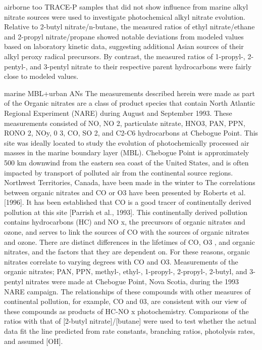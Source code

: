 \documentclass[11pt,a4paper]{article}
\begin{document}
\citep{Simpson2003} airborne too
TRACE-P samples that did not show influence from marine alkyl nitrate sources were used to investigate photochemical alkyl nitrate evolution. Relative to 2-butyl nitrate/n-butane, the measured ratios of ethyl nitrate/ethane and 2-propyl nitrate/propane showed notable deviations from modeled values based on laboratory kinetic data, suggesting additional Asian sources of their alkyl peroxy radical precursors. By contrast, the measured ratios of 1-propyl-, 2-pentyl-, and 3-pentyl nitrate to their respective parent hydrocarbons were fairly close to modeled values.

\citep{Roberts1998} marine MBL+urban ANs
The measurements described herein were made as part of the
Organic nitrates are a class of product species that contain
North Atlantic Regional Experiment (NARE) during August and September 1993. These measurements consisted of NO, NO 2, particulate nitrate, HNO3, PAN, PPN, RONO 2, NOy, 0 3, CO, SO 2, and C2-C6 hydrocarbons at Chebogue Point. This site was ideally located to study the evolution of photochemically processed air masses in the marine boundary layer (MBL). Chebogue Point is approximately 500 km downwind from the eastern sea coast of the United States, and is often impacted by transport of polluted air from the continental source regions.
Northwest Territories, Canada, have been made in the winter to
The correlations between organic nitrates and CO or O3 have been presented by Roberts et al. [1996]. It has been established that CO is a good tracer of continentally derived pollution at this site [Parrish et al., 1993]. This continentally derived pollution contains hydrocarbons (HC) and NO x, the precursors of organic nitrates and ozone, and serves to link the sources of CO with the sources of organic nitrates and ozone. There are distinct differences in the lifetimes of CO, O3 , and organic nitrates, and the factors that they are dependent on. For these reasons, organic nitrates correlate to varying degrees with CO and O3.
Measurements of the organic nitrates; PAN, PPN, methyl-,
ethyl-, 1-propyl-, 2-propyl-, 2-butyl, and 3-pentyl nitrates were made at Chebogue Point, Nova Scotia, during the 1993 NARE campaign. The relationships of these compounds with other measures of continental pollution, for example, CO and 03, are consistent with our view of these compounds as products of HC-NO x photochemistry.
Comparisons of the ratios with that of [2-butyl nitrate]/[butane] were used to test whether the actual data fit the line predicted from rate constants, branching ratios, photolysis rates, and assumed [OH].
\end{document}
